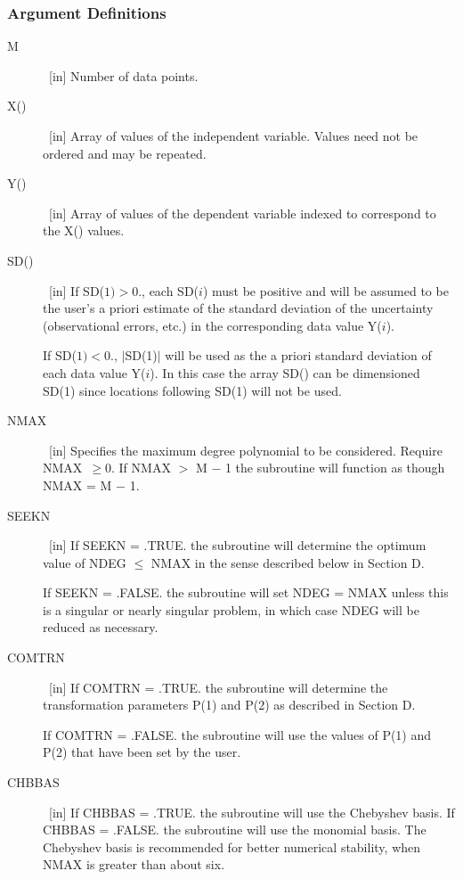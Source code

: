 \documentclass[twoside]{MATH77}
\begin{document}
\subsubsection{Argument Definitions}
\begin{description}
\item[M]  \ [in] Number of data points.

\item[X()]  \ [in] Array of values of the independent variable. Values need
not be ordered and may be repeated.

\item[Y()]  \ [in] Array of values of the dependent variable indexed to
correspond to the X() values.

\item[SD()]  \ [in] If SD($1)>0.$, each SD($i$) must be positive and will be
assumed to be the user's a priori estimate of the standard deviation of the
uncertainty (observational errors, etc.) in the corresponding data value
Y($i$).

If SD($1)<0.$, $|$SD(1)$|$ will be used as the a priori standard deviation
of each data value Y($i$). In this case the array SD() can be dimensioned
SD(1) since locations following SD(1) will not be used.

\item[NMAX]  \ [in] Specifies the maximum degree polynomial to be
considered. Require NMAX\ $\geq 0$. If NMAX $>$ M $-$ 1 the subroutine will
function as though NMAX = M $-$ 1.

\item[SEEKN]  \ [in] If SEEKN = .TRUE. the subroutine will determine the
optimum value of NDEG $\leq $ NMAX in the sense described below in Section D.

If SEEKN = .FALSE. the subroutine will set NDEG = NMAX unless this is a
singular or nearly singular problem, in which case NDEG will be reduced as
necessary.

\item[COMTRN]  \ [in] If COMTRN = .TRUE. the subroutine will determine the
transformation parameters P(1) and P(2) as described in Section D.

If COMTRN = .FALSE. the subroutine will use the values of P(1) and P(2) that
have been set by the user.

\item[CHBBAS]  \ [in] If CHBBAS = .TRUE. the subroutine will use the
Chebyshev basis. If CHBBAS = .FALSE. the subroutine will use the monomial
basis. The Chebyshev basis is recommended for better numerical stability,
when NMAX is greater than about six.


\end{description}
\end{document}
